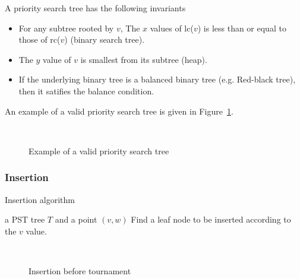 \documentclass{acm_proc_article-sp}          %
\begin{document}
A priority search tree has the following invariants
\begin{itemize}
\item
For any subtree rooted by $v$,
The $x$ values of lc($v$) is less than or equal to those of rc($v$) 
(binary search tree).
\item
The $y$ value of $v$ is smallest from its subtree (heap).
\item
If the underlying binary tree is a balanced binary tree
(e.g. Red-black tree), then it satifies the balance condition.
\end{itemize}

An example of a valid priority search tree is given in
Figure~\ref{fig:pst}. 

\begin{figure}[ht]
  \centering
  \\
  \caption{Example of a valid priority search tree}\label{fig:pst}
\end{figure}

\subsubsection{Insertion}


\begin{algorithm}[ht]
\caption{Insertion algorithm}
\label{alg:pst_insert}
    \begin{algorithmic}[1]
     \REQUIRE a PST tree $T$ and a point $(v,w)$
     \STATE Find a leaf node to be inserted according to the $v$ value.
    \end{algorithmic}
\end{algorithm}

\begin{figure}[ht]
  \centering
  \\
  \caption{Insertion before tournament}\label{fig:pst_just_insert}
\end{figure}
\end{document}
